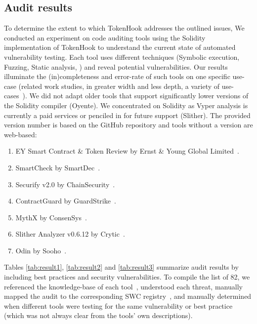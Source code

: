 \subsection{Audit results}
To determine the extent to which TokenHook addresses the outlined issues, We conducted an experiment on code auditing tools using the Solidity implementation of TokenHook to understand the current state of automated vulnerability testing. Each tool uses different techniques (\eg Symbolic execution, Fuzzing, Static analysis, \etc) and reveal potential vulnerabilities. Our results illuminate the (in)completeness and error-rate of such tools on one specific use-case (related work studies, in greater width and less depth, a variety of use-cases~\cite{AuditTools}). We did not adapt older tools that support significantly lower versions of the Solidity compiler (\eg Oyente). We concentrated on Solidity as Vyper analysis is currently a paid services or penciled in for future support (\eg Slither). The provided version number is based on the GitHub repository and tools without a version are web-based:
\begin{enumerate}
	\item EY Smart Contract \& Token Review by Ernst \& Young Global Limited~\cite{EYTool}.
	\item SmartCheck by SmartDec~\cite{SMARTCHECK}.
	\item Securify v2.0 by ChainSecurity~\cite{SECURIFYGIT,SECURIFY}.
	\item ContractGuard by GuardStrike~\cite{ContractGuard}.
	\item MythX by ConsenSys~\cite{MythX}.
	\item Slither Analyzer v0.6.12 by Crytic~\cite{SlitherDoc}.
	\item Odin by Sooho~\cite{Odin}.
\end{enumerate}



Tables \ref{tab:result1}, \ref{tab:result2} and \ref{tab:result3} summarize audit results by including best practices and security vulnerabilities. To compile the list of 82, we referenced the knowledge-base of each tool~\cite{SECURIFYGIT,SMARTCHECK,MythX,ContractGuard,SlitherDoc}, understood each threat, manually mapped the audit to the corresponding SWC registry~\cite{SWC}, and manually determined when different tools were testing for the same vulnerability or best practice (which was not always clear from the tools' own descriptions). 


